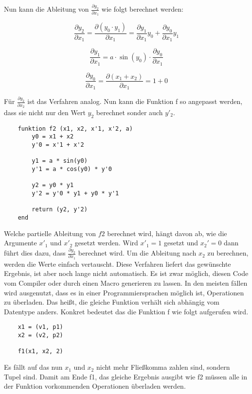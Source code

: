 Nun kann die Ableitung von $\frac{\partial y_2}{\partial x_1}$ wie folgt berechnet werden:

$$
	\frac{\partial y_2}{\partial x_1} = \frac{\partial (y_0 \cdot y_1)}{\partial x_1} = \frac{\partial  y_1}{\partial x_1} y_0  + \frac{\partial y_0 }{\partial x_1} y_1
$$

$$
	\frac{\partial y_1}{ \partial x_1 } = a \cdot \sin(y_0) \cdot \frac{\partial y_0}{\partial x_1}
$$

$$
	\frac{\partial y_0}{\partial x_1} = \frac{\partial (x_1 + x_2)}{\partial x_1} = 1 + 0
$$

Für $\frac{\partial y_2}{\partial x_2}$ ist das Verfahren analog. 
Nun kann die Funktion f so angepasst werden, dass sie nicht nur den Wert $y_2$ berechnet sonder auch $y'_2$.

\begin{lstlisting}
    funktion f2 (x1, x2, x'1, x'2, a)
        y0 = x1 + x2
        y'0 = x'1 + x'2

        y1 = a * sin(y0)
        y'1 = a * cos(y0) * y'0

		y2 = y0 * y1
        y'2 = y'0 * y1 + y0 * y'1
        
        return (y2, y'2)
    end
\end{lstlisting}

Welche partielle Ableitung von $f2$ berechnet wird, hängt davon ab, wie die Argumente $x'_1$ und $x'_2$ gesetzt werden.
Wird $x'_1 = 1$ gesetzt und $x_2' = 0$ dann führt dies dazu, dass $\frac{\partial y_2}{\partial x_1}$ berechnet wird.
Um die Ableitung nach $x_2$ zu berechnen, werden die Werte einfach vertauscht.
Diese Verfahren liefert das gewünschte Ergebnis, ist aber noch lange nicht automatisch.
Es ist zwar möglich, diesen Code vom Compiler oder durch einen Macro generieren zu lassen.
In den meisten fällen wird ausgenutzt, dass es in einer 
Programmiersprachen möglich ist, Operationen zu überladen.
Das heißt, die gleiche Funktion verhält sich abhängig vom Datentype anders.
Konkret bedeutet das die Funktion f wie folgt aufgerufen wird.

\begin{lstlisting}
	x1 = (v1, p1)
    x2 = (v2, p2)
    
    f1(x1, x2, 2)
\end{lstlisting}

Es fällt auf das nun $x_1$ und $x_2$ nicht mehr Fließkomma zahlen sind, sondern Tupel sind.
Damit am Ende f1, das gleiche Ergebnis ausgibt wie f2 müssen alle in der Funktion vorkommenden Operationen überladen werden.

